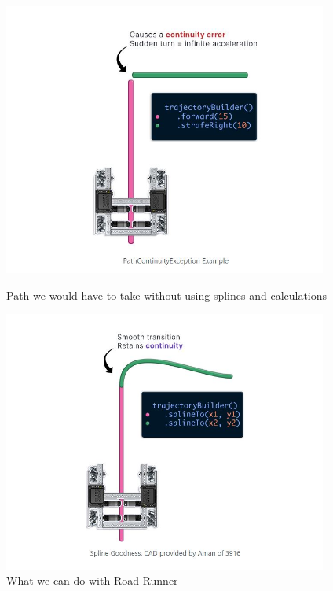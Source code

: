 \begin{figure}[ht]
\centering
\begin{minipage}[b]{.48\textwidth}
  \centering
  \includegraphics[width=0.95\textwidth]{Meetings/January/01-05-22/1.5.22 without spline - James Hu.JPG}
  \caption{Path we would have to take without using splines and calculations}
  \label{fig:010522_1}
\end{minipage}%
\hfill%
\begin{minipage}[b]{.48\textwidth}
  \centering
  \includegraphics[width=0.95\textwidth]{Meetings/January/01-05-22/1.5.22 with spline - James Hu.JPG}
  \caption{What we can do with Road Runner}
  \label{fig:010522_2}
\end{minipage}
\end{figure}


